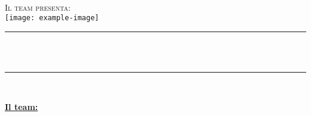 \makeatletter
\let\thetitle\@title
\let\theauthor\@author
\let\thedate\@date
\makeatother

\begin{titlepage}
		\centering
		
		\vspace*{0.5 cm}
		\textsc{\large \tipoDocumento}\\[0.5 cm]
		\textsc{\Large Il team \theteam{} presenta:}\\[1 cm]
		\texttt{[image: example-image]}\\[0.5 cm]
		
		\rule{\linewidth}{0.2 mm}\\[0.4 cm]
		{ \huge \bfseries \textsc{\ProjectTitle}}\\
		\rule{\linewidth}{0.2 mm}\\[1.5 cm]
		
		\begin{minipage}{0.4\textwidth}
			\begin{center} \large %
				\textbf{\underline{Il team:}}\\
				\theauthor
			\end{center}
		\end{minipage}~
\\[2 cm]
		{\large \thedate}\\[2 cm]
		
		\cleardoublepage
		
	\end{titlepage}